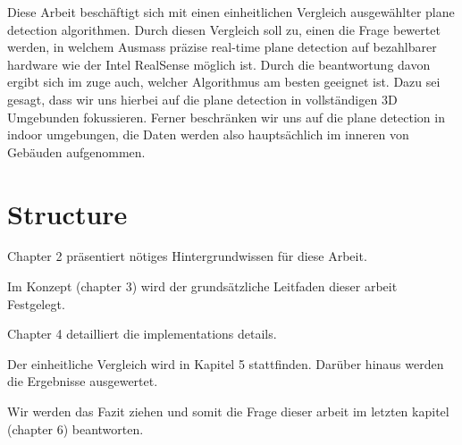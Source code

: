 \documentclass[main.tex]{subfiles}
\begin{document}
Diese Arbeit beschäftigt sich mit einen einheitlichen Vergleich ausgewählter plane detection algorithmen.
Durch diesen Vergleich soll zu, einen die Frage bewertet werden, in welchem Ausmass präzise real-time plane detection auf 
bezahlbarer hardware wie der Intel RealSense möglich ist. Durch die beantwortung davon ergibt sich im zuge auch, welcher Algorithmus 
am besten geeignet ist.
Dazu sei gesagt, dass wir uns hierbei auf die plane detection in vollständigen 3D Umgebunden fokussieren. Ferner beschränken wir uns auf die plane detection in 
indoor umgebungen, die Daten werden also hauptsächlich im inneren von Gebäuden aufgenommen. 

\section{Structure}
Chapter 2 präsentiert nötiges Hintergrundwissen für diese Arbeit.

Im Konzept (chapter 3) wird der grundsätzliche Leitfaden dieser arbeit Festgelegt.

Chapter 4 detailliert die implementations details.

Der einheitliche Vergleich wird in Kapitel 5 stattfinden. Darüber hinaus werden die Ergebnisse ausgewertet.

Wir werden das Fazit ziehen und somit die Frage dieser arbeit im letzten kapitel (chapter 6) beantworten.
\end{document}
